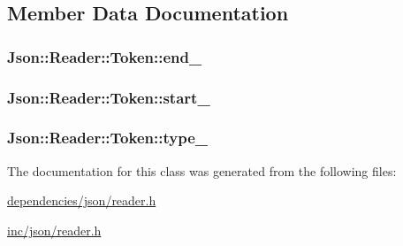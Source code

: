 \subsection{Member Data Documentation}
\hypertarget{classJson_1_1Reader_1_1Token_a7d3bc0fa40097f435d184be4b1fd5ae1}{
\subsubsection[{end\-\_\-}]{ Json\-::\-Reader\-::\-Token\-::end\-\_\-}}\label{d2/d8f/classJson_1_1Reader_1_1Token_a7d3bc0fa40097f435d184be4b1fd5ae1}
\hypertarget{classJson_1_1Reader_1_1Token_aff87d677b9ac4b52542a00b0d6673249}{
\subsubsection[{start\-\_\-}]{ Json\-::\-Reader\-::\-Token\-::start\-\_\-}}\label{d2/d8f/classJson_1_1Reader_1_1Token_aff87d677b9ac4b52542a00b0d6673249}
\hypertarget{classJson_1_1Reader_1_1Token_aa0f06d0105ec3d8cb42427c66b991bad}{
\subsubsection[{type\-\_\-}]{ Json\-::\-Reader\-::\-Token\-::type\-\_\-}}\label{d2/d8f/classJson_1_1Reader_1_1Token_aa0f06d0105ec3d8cb42427c66b991bad}


The documentation for this class was generated from the following files\-:\begin{DoxyCompactItemize}
\item 
\hyperlink{dependencies_2json_2reader_8h}{dependencies/json/reader.\-h}\item 
\hyperlink{inc_2json_2reader_8h}{inc/json/reader.\-h}\end{DoxyCompactItemize}

